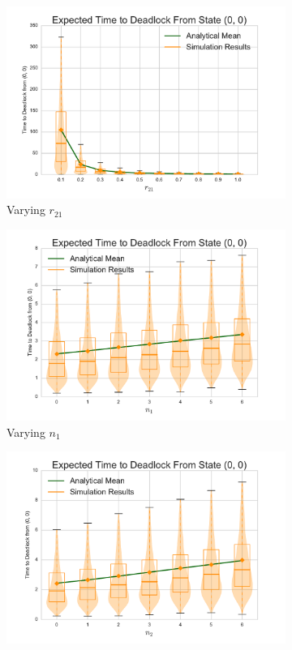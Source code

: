 \documentclass{article}
\numberwithin{equation}{section}
\begin{document}
\begin{figure}[!htbp]
\begin{subfigure}[b]{0.333\textwidth}
    \includegraphics[width=\textwidth]{images/varyr21_2Nms}
    \caption{Varying $r_{21}$}
    \label{fig:2Nms_r21}
  \end{subfigure}
  \begin{center}
  \begin{subfigure}[b]{0.34\textwidth}
    \includegraphics[width=\textwidth]{images/varyn1_2Nms}
    \caption{Varying $n_1$}
    \label{fig:2Nms_n1}
  \end{subfigure}
  \begin{subfigure}[b]{0.34\textwidth}
    \includegraphics[width=\textwidth]{images/varyn2_2Nms}

\end{subfigure}
\end{center}
\end{figure}
\end{document}
